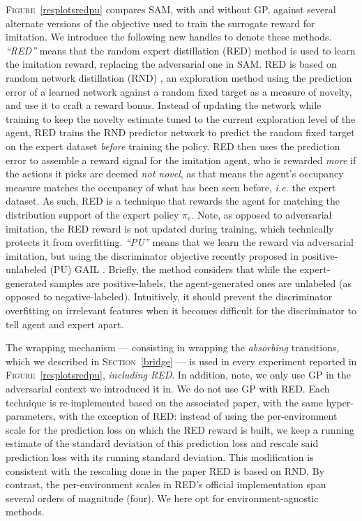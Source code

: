 \textsc{Figure}~\ref{resplotsredpu} compares SAM,
with and without GP,
against several alternate versions of the objective used
to train the surrogate reward for imitation.
We introduce the following new handles to denote these methods.
\textit{``RED''} means that the random expert distillation (RED) \cite{Wang2019-pd}
method is used to learn the imitation reward, replacing the adversarial one in SAM.
RED is based on random network distillation (RND) \cite{Burda2018-vl},
an exploration method using the prediction error of a learned network against a random fixed target
as a measure of novelty, and use it to craft a reward bonus.
Instead of updating the network while training to keep the novelty estimate tuned to
the current exploration level of the agent, RED trains the RND predictor network
to predict the random fixed target on the expert dataset \emph{before} training the policy.
RED then uses the prediction error to assemble a reward signal for the imitation agent,
who is rewarded \emph{more} if the actions it picks are deemed \emph{not novel},
as that means the agent's occupancy measure matches the occupancy of what has been seen before,
\textit{i.e.} the expert dataset. As such, RED is a technique that rewards the agent for
matching the distribution support of the expert policy $\pi_e$.
Note, as opposed to adversarial imitation, the RED reward is not updated during training,
which technically protects it from overfitting.
\textit{``PU''} means that we learn the reward via adversarial
imitation, but using the discriminator objective
recently proposed in positive-unlabeled (PU) GAIL \cite{Xu2019-uo}.
Briefly, the method considers that while the expert-generated samples
are positive-labels,
the agent-generated ones are unlabeled (as opposed to negative-labeled).
Intuitively, it should prevent the discriminator overfitting on irrelevant features
when it becomes difficult for the discriminator to tell agent and expert apart.

The wrapping mechanism
--- consisting in wrapping the \emph{absorbing} transitions,
which we described in \textsc{Section}~\ref{bridge} ---
is used in every experiment reported in \textsc{Figure}~\ref{resplotsredpu},
\emph{including RED}.
In addition, note, we only use GP in the adversarial context we introduced it in.
We do not use GP with RED.
Each technique is re-implemented based on the associated paper,
with the same hyper-parameters, with the exception of RED:
instead of using the per-environment scale for the prediction loss on which the
RED reward is built, we keep a running estimate of the standard deviation of this
prediction loss and rescale said prediction loss with its running standard deviation.
This modification is consistent with the rescaling done in
the paper RED is based on RND.
By contrast, the per-environment scales in RED's official implementation
span several orders of magnitude (four).
We here opt for environment-agnostic methods.

